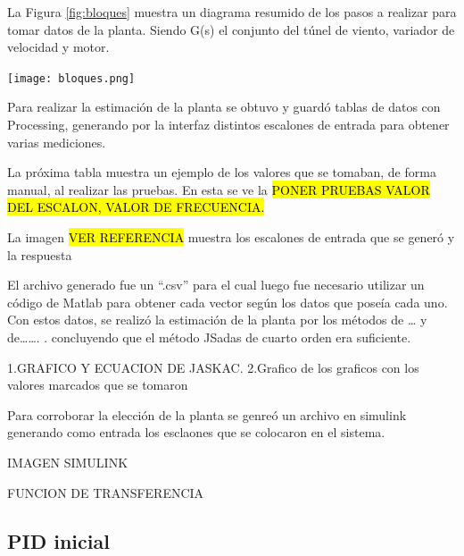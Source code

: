     La Figura \ref{fig:bloques} muestra un diagrama resumido de los pasos a realizar para tomar datos de la planta. Siendo G(s) el conjunto del túnel de viento, variador de velocidad y motor.
 
    \begin{center}
    	\texttt{[image: bloques.png]}
    	\label{fig:bloques}    
    \end{center}
    
    Para realizar la estimación de la planta se obtuvo y guardó tablas de datos con Processing, generando por la interfaz distintos escalones de entrada para obtener varias mediciones.
    
    La próxima tabla muestra un ejemplo de los valores que se tomaban, de forma manual, al realizar las pruebas. En esta se ve la 
    \hl{PONER PRUEBAS VALOR DEL ESCALON, VALOR DE FRECUENCIA.}
    
    La imagen \hl{VER REFERENCIA} muestra los escalones de entrada que se generó y la respuesta 
    
    El archivo generado fue un “.csv” para el cual luego fue necesario utilizar un código de Matlab para obtener cada vector según los datos que poseía cada uno. Con estos datos, se realizó la estimación de la planta por los métodos de … y de……. . concluyendo que el método JSadas de cuarto orden era suficiente.
    
    1.GRAFICO Y ECUACION DE JASKAC.
    2.Grafico de los graficos con los valores marcados que se tomaron
    
    Para corroborar la elección de la planta se genreó un archivo en simulink generando como entrada los esclaones que se colocaron en el sistema.
    
    IMAGEN SIMULINK
    
    FUNCION DE TRANSFERENCIA

    
    \subsection{PID inicial}
    
    \newpage